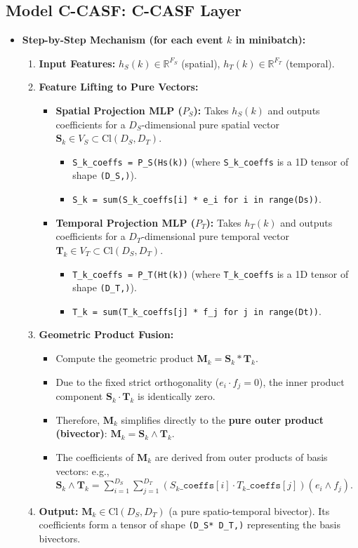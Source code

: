 \documentclass[11pt]{article}
\newcommand{\Cl}[2]{\text{Cl}(#1, #2)} %
\newcommand{\R}{\mathbb{R}}
\newcommand{\Fs}{F_S} %
\newcommand{\Ft}{F_T} %
\newcommand{\Ds}{D_S} %
\newcommand{\Dt}{D_T} %
\newcommand{\Hs}{h_S} %
\newcommand{\Ht}{h_T} %
\newcommand{\Svec}{\mathbf{S}} %
\newcommand{\Tvec}{\mathbf{T}} %
\newcommand{\Mvec}{\mathbf{M}} %
\newenvironment{modeldescription}[1]{%
    \subsection*{Model #1: \MakeUppercase{#1} Layer}%
    \begin{itemize}[leftmargin=*,noitemsep]%
}{%
    \end{itemize}%
}
\begin{document}
\begin{modeldescription}{C-CASF}
    \item \textbf{Step-by-Step Mechanism (for each event $k$ in minibatch):}
    \begin{enumerate}[noitemsep]
        \item \textbf{Input Features:} $\Hs(k) \in \R^{\Fs}$ (spatial), $\Ht(k) \in \R^{\Ft}$ (temporal).
        \item \textbf{Feature Lifting to Pure Vectors:}
        \begin{itemize}[noitemsep]
            \item \textbf{Spatial Projection MLP ($P_S$):} Takes $\Hs(k)$ and outputs coefficients for a $\Ds$-dimensional pure spatial vector $\Svec_k \in V_S \subset \Cl{\Ds}{\Dt}$.
                \begin{itemize}[noitemsep]
                    \item \texttt{S\_k\_coeffs = P\_S(Hs(k))} (where \texttt{S\_k\_coeffs} is a 1D tensor of shape \texttt{(\Ds,)}).
                    \item \texttt{S\_k = sum(S\_k\_coeffs[i] * e\_i for i in range(Ds))}.
                \end{itemize}
            \item \textbf{Temporal Projection MLP ($P_T$):} Takes $\Ht(k)$ and outputs coefficients for a $\Dt$-dimensional pure temporal vector $\Tvec_k \in V_T \subset \Cl{\Ds}{\Dt}$.
                \begin{itemize}[noitemsep]
                    \item \texttt{T\_k\_coeffs = P\_T(Ht(k))} (where \texttt{T\_k\_coeffs} is a 1D tensor of shape \texttt{(\Dt,)}).
                    \item \texttt{T\_k = sum(T\_k\_coeffs[j] * f\_j for j in range(Dt))}.
                \end{itemize}
        \end{itemize}
        \item \textbf{Geometric Product Fusion:}
        \begin{itemize}[noitemsep]
            \item Compute the geometric product $\Mvec_k = \Svec_k * \Tvec_k$.
            \item Due to the fixed strict orthogonality ($e_i \cdot f_j = 0$), the inner product component $\Svec_k \cdot \Tvec_k$ is identically zero.
            \item Therefore, $\Mvec_k$ simplifies directly to the \textbf{pure outer product (bivector)}: $\Mvec_k = \Svec_k \wedge \Tvec_k$.
            \item The coefficients of $\Mvec_k$ are derived from outer products of basis vectors: e.g., $\Svec_k \wedge \Tvec_k = \sum_{i=1}^{\Ds} \sum_{j=1}^{\Dt} (S_k\texttt{\_coeffs}[i] \cdot T_k\texttt{\_coeffs}[j]) (e_i \wedge f_j)$.
        \end{itemize}
        \item \textbf{Output:} $\Mvec_k \in \Cl{\Ds}{\Dt}$ (a pure spatio-temporal bivector). Its coefficients form a tensor of shape \texttt{(\Ds * \Dt,)} representing the basis bivectors.
    \end{enumerate}


\end{modeldescription}
\end{document}
